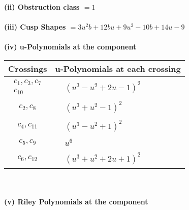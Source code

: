 \documentclass[1p]{elsarticle_modified}
\theoremstyle{definition}
\begin{document}
\flushleft \textbf{(ii) Obstruction class $= 1$}\\~\\
\flushleft \textbf{(iii) Cusp Shapes $= 3 u^2 b+12 b u+9 u^2-10 b+14 u-9$}\\~\\
\newpage\renewcommand{\arraystretch}{1}
\flushleft \textbf{(iv) u-Polynomials at the component}\newline \\
\begin{tabular}{m{50pt}|m{274pt}}
Crossings & \hspace{64pt}u-Polynomials at each crossing \\
\hline $$\begin{aligned}c_{1},c_{3},c_{7}\\c_{10}\end{aligned}$$&$\begin{aligned}
&(u^3- u^2+2 u-1)^2
\end{aligned}$\\
\hline $$\begin{aligned}c_{2},c_{8}\end{aligned}$$&$\begin{aligned}
&(u^3+u^2-1)^2
\end{aligned}$\\
\hline $$\begin{aligned}c_{4},c_{11}\end{aligned}$$&$\begin{aligned}
&(u^3- u^2+1)^2
\end{aligned}$\\
\hline $$\begin{aligned}c_{5},c_{9}\end{aligned}$$&$\begin{aligned}
&u^6
\end{aligned}$\\
\hline $$\begin{aligned}c_{6},c_{12}\end{aligned}$$&$\begin{aligned}
&(u^3+u^2+2 u+1)^2
\end{aligned}$\\
\hline
\end{tabular}\\~\\
\newpage\renewcommand{\arraystretch}{1}
\flushleft \textbf{(v) Riley Polynomials at the component}\newline \\
\end{document}

